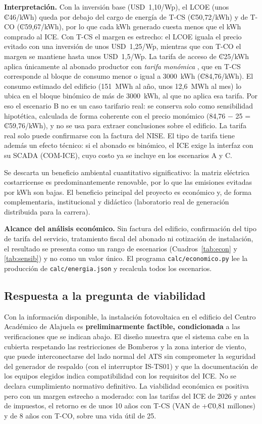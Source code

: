 \documentclass[12pt]{article}
\begin{document}
\textbf{Interpretación.} Con la inversión base (USD~1,10/Wp), el LCOE (unos ₡46/kWh) queda por debajo del cargo de energía de T-CS (₡50,72/kWh) y de T-CO (₡59,67/kWh), por lo que cada kWh generado cuesta menos que el kWh comprado al ICE. Con T-CS el margen es estrecho: el LCOE iguala el precio evitado con una inversión de unos USD~1,25/Wp, mientras que con T-CO el margen se mantiene hasta unos USD~1,5/Wp. La tarifa de acceso de ₡25/kWh aplica únicamente al abonado productor con \emph{tarifa monómica} \cite{iceTarRED}, que en T-CS corresponde al bloque de consumo menor o igual a 3000~kWh (₡84,76/kWh). El consumo estimado del edificio (151~MWh al año, unos 12,6~MWh al mes) lo ubica en el bloque binómico de más de 3000~kWh, al que no aplica esa tarifa. Por eso el escenario B no es un caso tarifario real: se conserva solo como sensibilidad hipotética, calculada de forma coherente con el precio monómico (84,76 $-$ 25 = ₡59,76/kWh), y no se usa para extraer conclusiones sobre el edificio. La tarifa real solo puede confirmarse con la factura del NISE. El tipo de tarifa tiene además un efecto técnico: si el abonado es binómico, el ICE exige la interfaz con su SCADA (COM-ICE), cuyo costo ya se incluye en los escenarios A y C.

Se descarta un beneficio ambiental cuantitativo significativo: la matriz eléctrica costarricense es predominantemente renovable, por lo que las emisiones evitadas por kWh son bajas. El beneficio principal del proyecto es económico y, de forma complementaria, institucional y didáctico (laboratorio real de generación distribuida para la carrera).

\textbf{Alcance del análisis económico.} Sin factura del edificio, confirmación del tipo de tarifa del servicio, tratamiento fiscal del abonado ni cotización de instalación, el resultado se presenta como un rango de escenarios (Cuadros~\ref{tab:econ} y \ref{tab:sensib}) y no como un valor único. El programa \texttt{calc/economico.py} lee la producción de \texttt{calc/energia.json} y recalcula todos los escenarios.

\subsection{Respuesta a la pregunta de viabilidad}
Con la información disponible, la instalación fotovoltaica en el edificio del Centro Académico de Alajuela es \textbf{preliminarmente factible, condicionada} a las verificaciones que se indican abajo. El diseño muestra que el sistema cabe en la cubierta respetando las restricciones de Bomberos y la zona interior de viento, que puede interconectarse del lado normal del ATS sin comprometer la seguridad del generador de respaldo (con el interruptor IS-TS01) y que la documentación de los equipos elegidos indica compatibilidad con los requisitos del ICE. No se declara cumplimiento normativo definitivo. La viabilidad económica es positiva pero con un margen estrecho a moderado: con las tarifas del ICE de 2026 y antes de impuestos, el retorno es de unos 10 años con T-CS (VAN de +₡0,81 millones) y de 8 años con T-CO, sobre una vida útil de 25.
\end{document}
